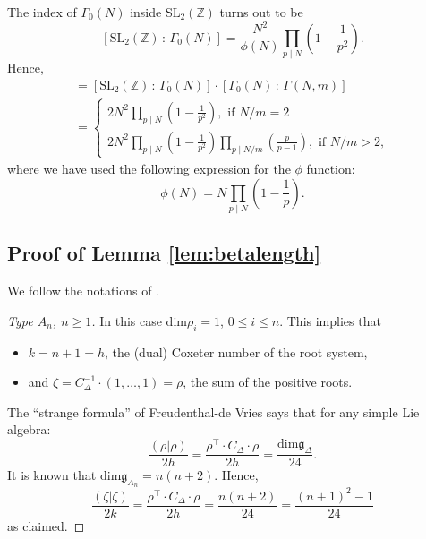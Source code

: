 \documentclass[11pt,a4paper]{amsart}
\theoremstyle{definition}
\newcommand{\SZ}{\mathbb{Z}}                    %
\begin{document}
The index of $\Gamma_0(N)$ inside $\mathrm{SL}_2(\SZ)$ turns out to be
\[  [\mathrm{SL}_2(\SZ) \, : \, \Gamma_0(N) ]=\frac{N^2}{\phi(N)}\prod_{p \mid N}\left(1-\frac{1}{p^2} \right). \]
Hence,
\begin{multline*} [\mathrm{SL}_2(\SZ) \, : \, \Gamma(N,m) ] = [\mathrm{SL}_2(\SZ) \, : \, \Gamma_0(N) ] \cdot [\Gamma_0(N) \, : \, \Gamma(N,m) ] \\
=\begin{cases} 
2N^2\prod_{p \mid N}\left(1-\frac{1}{p^2} \right),\textrm{ if } N/m =2 \\
2N^2\prod_{p \mid N}\left(1-\frac{1}{p^2} \right) \prod_{p \mid N/m }\left(\frac{p}{p-1} \right),\textrm{ if } N/m >2,
\end{cases}
\end{multline*}
where we have used the following expression for the $\phi$ function:
\[ \phi(N)=N \prod_{p \mid  N}\left(1-\frac{1}{p} \right). \]

\subsection{Proof of Lemma \ref{lem:betalength}}
\label{sec:app1}
We follow the notations of \cite{bourbaki2002lie}. %
\begin{proof}[Type $A_n$, $n \geq 1$]
\label{sec:app11}
In this case $\mathrm{dim} \rho_i = 1$, $0 \leq i \leq n$. This implies that 
\begin{itemize}
 \item $k=n+1=h$, the (dual) Coxeter number of the root system,
 \item and $\zeta = C_{\Delta}^{-1} \cdot (1,\dots,1)= \rho$, the sum of the positive roots.
\end{itemize}
The ``strange formula'' of Freudenthal-de Vries \cite{freudenthal1969linear} says that for any simple Lie algebra:
\[ \frac{(\rho|\rho)}{2h}=\frac{\rho^\top \cdot C_\Delta \cdot \rho}{2h}=\frac{\mathrm{dim} \mathfrak{g}_{\Delta}}{24}. \]
It is known that $\mathrm{dim} \mathfrak{g}_{A_n}= n(n+2)$. Hence,
\[ \frac{(\zeta|\zeta)}{2k}=\frac{\rho^\top \cdot C_\Delta \cdot \rho}{2h}=\frac{n(n+2)}{24}=\frac{(n+1)^2-1}{24} \]
as claimed.
\end{proof}
\end{document}
